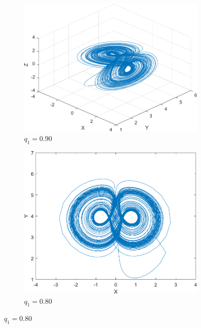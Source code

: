 \begin{figure}[H]
        \centering
        \begin{subfigure}[b]{0.475\textwidth}
            \centering
            \includegraphics[scale=0.5]{files/a_0_9_1_1.pdf}
            \caption{$q_1=0.90$}    
            \label{fig:3a}
        \end{subfigure}
        \hfill
        \begin{subfigure}[b]{0.475\textwidth}  
            \centering 
            \includegraphics[scale=0.5]{files/b080_1_1.pdf}
            \caption{$q_1=0.80$}  
            \label{fig:mean and std of net24}
        \end{subfigure}

\end{figure}
